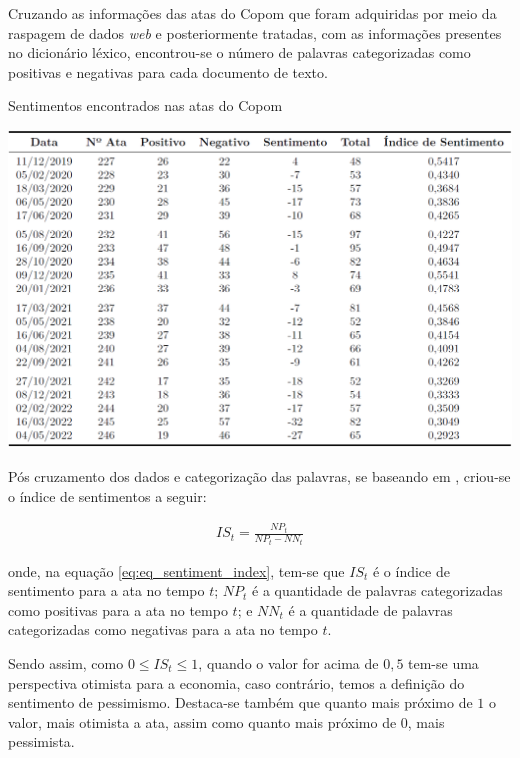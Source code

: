 Cruzando as informações das atas do Copom que foram adquiridas por meio da raspagem de dados \textit{web} e posteriormente tratadas, com as informações presentes no dicionário léxico, encontrou-se o número de palavras categorizadas como positivas e negativas para cada documento de texto. 

\begin{table}[hbtp]
	\centering
	\caption{Sentimentos encontrados nas atas do Copom} \label{table:sentiment_index}
	\includegraphics[scale = 0.45]{figuras/tabela_sentimento.PNG}
\end{table}

Pós cruzamento dos dados e categorização das palavras, se baseando em , criou-se o índice de sentimentos a seguir:

\begin{ceqn}
\begin{align} \label{eq:eq_sentiment_index}
 IS_{t} = \frac{NP_{t}}{NP_{t} - NN_{t}} 
\end{align}
\end{ceqn} onde, na equação \eqref{eq:eq_sentiment_index}, tem-se que $IS_{t}$ é o índice de sentimento para a ata no tempo $t$; $NP_{t}$ é a quantidade de palavras categorizadas como positivas para a ata no tempo $t$; e $NN_{t}$ é a quantidade de palavras categorizadas como negativas para a ata no tempo $t$.

Sendo assim, como $0 \leq IS_{t} \leq 1$, quando o valor for acima de $0,5$ tem-se uma perspectiva otimista para a economia, caso contrário, temos a definição do sentimento de pessimismo. Destaca-se também que quanto mais próximo de $1$ o valor, mais otimista a ata, assim como quanto mais próximo de $0$, mais pessimista.

